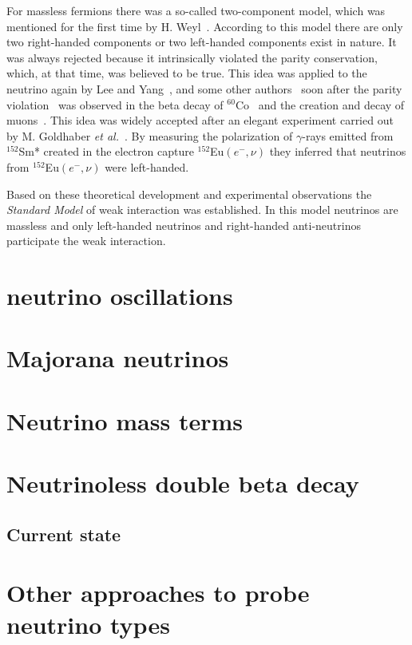 For massless fermions there was a so-called two-component model, which
was mentioned for the first time by H. Weyl~\cite{Wey29}. According to
this model there are only two right-handed components or two
left-handed components exist in nature. It was always rejected because
it intrinsically violated the parity conservation, which, at that
time, was believed to be true. This idea was applied to the neutrino
again by Lee and Yang~\cite{Lee57}, and some other
authors~\cite{Sal57,Lan57} soon after the parity
violation~\cite{Lee56} was observed in the beta decay of
$^{60}$Co~\cite{Wu57} and the creation and decay of
muons~\cite{Gar57,Fri57}. This idea was widely accepted after an
elegant experiment carried out by M. Goldhaber \textit{et
  al.}~\cite{Gol58}. By measuring the polarization of $\gamma$-rays
emitted from $^{152}$Sm* created in the electron capture
$^{152}$Eu$(e^-,\nu)$ they inferred that neutrinos from
$^{152}$Eu$(e^-,\nu)$ were left-handed.

Based on these theoretical development and experimental observations
the \emph{Standard Model} of weak interaction was established. In this
model neutrinos are massless and only left-handed neutrinos and
right-handed anti-neutrinos participate the weak interaction.

\section{neutrino oscillations}
\label{sec:osci}

\section{Majorana neutrinos}
\label{sec:major}

\section{Neutrino mass terms}
\label{sec:mass}

\section{Neutrinoless double beta decay}
\label{sec:0n2b}

\subsection{Current state}
\label{sec:state}

\section{Other approaches to probe neutrino types}
\label{sec:others}



